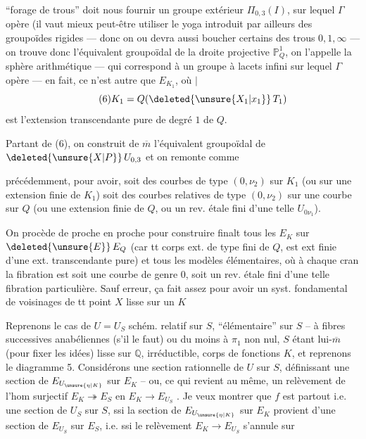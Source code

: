 ``forage de trous'' doit nous fournir un groupe extérieur $\Pi_{0,3}(I)$,  sur lequel $\Gamma$ opère (il vaut mieux peut-être utiliser le yoga introduit par ailleurs des groupoïdes rigides — donc on  ou devra aussi boucher certains des trous $0,1,\infty$ — on trouve donc l'équivalent groupoïdal de la  droite projective $\mathbb P^1_Q$, on l'appelle la sphère arithmétique — qui correspond à un groupe  à lacets infini sur lequel $\Gamma$ opère — en fait, ce n'est autre que $E_{K_1}$, où $\vert$
\[
\tag{6}K_1=Q(\deleted{\unsure{X_1|x_1}}\,T_1)
\]
est l'extension transcendante pure  de degré $1$ de $Q$.

Partant de (6), on construit de $\overline m$ l'équivalent groupoïdal de $\deleted{\unsure{X|P}}\,U_{0,3}$  et on remonte comme

précédemment, pour avoir, soit des courbes de type $(0,\nu_2)$ sur $K_1$\unsure{,} (ou sur une extension finie de $K_1$) soit des courbes relatives de type $(0,\nu_2)$ sur une courbe sur $Q$  (ou une extension finie de $Q$, ou un rev.  étale fini d'une telle $U_{0\nu_1}$).

On procède de proche en proche pour construire finalt tous les $E_K$ sur $\deleted{\unsure{E}}\,E_Q$ (car tt corps ext. de type fini de $Q$, est ext finie d'une ext. transcendante pure) et tous les modèles élémentaires, où à chaque cran la fibration est soit une courbe de genre $0$, soit un rev. étale fini d'une telle fibration particulière. Sauf erreur, ça fait assez pour avoir un syst. fondamental de voisinages de tt point  $X$ lisse sur un $K$

Reprenons le cas de $U=U_S$ schém. relatif sur $S$, ``élémentaire'' sur $S$ -- à fibres successives anabéliennes (s'il le faut) ou du moins à $\pi_1$ non nul, $S$ étant lui-$\overline m$ (pour fixer les idées) lisse sur $\mathbb{Q}$, irréductible, corps de fonctions $K$, et reprenons le diagramme 5. Considérons une section rationnelle  de $U$ sur $S$, définissant une section de $E_{U_{\unsure{\eta|K}}}$ sur $E_K$ -- ou, ce qui revient au même, un relèvement de l'hom surjectif $E_K\twoheadrightarrow E_S$ en $E_K\longrightarrow E_{U_S}$ . Je veux montrer que $f$ est partout  i.e. une section  de $U_S$ sur $S$, ssi la section de $E_{U_{\unsure{\eta|K}}}$ sur $E_K$ provient d'une section de $E_{U_S}$ sur $E_S$, i.e. ssi le relèvement $E_K\longrightarrow E_{U_S}$ s'annule sur

